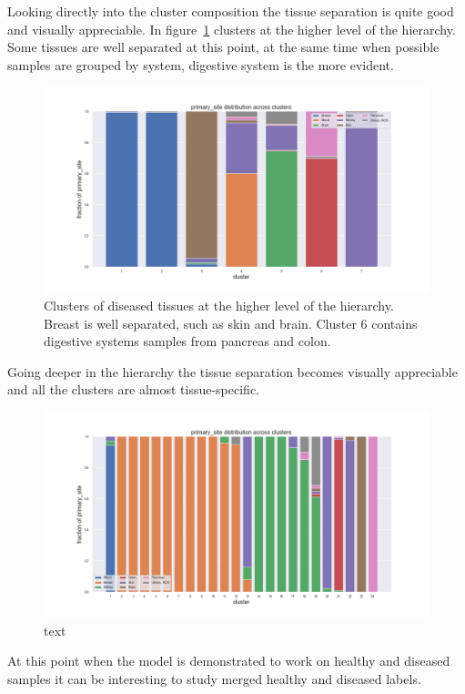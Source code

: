 Looking directly into the cluster composition the tissue separation is quite good and visually appreciable. In figure~\ref{fig:topic/tcga/fraction_clustercomposition_l4_primary_site} clusters at the higher level of the hierarchy. Some tissues are well separated at this point, at the same time when possible samples are grouped by system, digestive system is the more evident.
\begin{figure}[htb!]
	\centering
	\includegraphics[width=0.8\linewidth]{pictures/topic/tcga/fraction_clustercomposition_l4_primary_site.png}
	\caption{Clusters of diseased tissues at the higher level of the hierarchy. Breast is well separated, such as skin and brain. Cluster 6 contains digestive systems samples from pancreas and colon.}
	\label{fig:topic/tcga/fraction_clustercomposition_l4_primary_site}
\end{figure}
Going deeper in the hierarchy the tissue separation becomes visually appreciable and all the clusters are almost tissue-specific.
\begin{figure}[htb!]
	\centering
	\includegraphics[width=0.8\linewidth]{pictures/topic/tcga/fraction_clustercomposition_l3_primary_site.png}
	\caption{text}
	\label{fig:topic/tcga/fraction_clustercomposition_l3_primary_site}
\end{figure}

At this point when the model is demonstrated to work on healthy and diseased samples it can be interesting to study merged healthy and diseased labels.